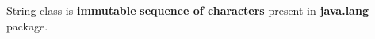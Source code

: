 \setlength{\columnsep}{3pt}
\begin{flushleft}

	String class is \textbf{immutable} \textbf{sequence of characters} present in \textbf{java.lang} package. 
	
\end{flushleft}






